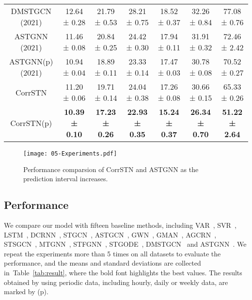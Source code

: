 \documentclass[sn-mathphys,iicol]{sn-jnl}
\newcommand\tabref[1]{Table~\ref{#1}}
\theoremstyle{thmstyleone}\newtheorem{theorem}{Theorem}\newtheorem{proposition}[theorem]{Proposition}
\theoremstyle{thmstyletwo}\newtheorem{example}{Example}\newtheorem{remark}{Remark}
\theoremstyle{thmstylethree}\newtheorem{definition}{Definition}
\begin{document}
\begin{table*}[!h]
{\begin{tabular}{c|ccc|ccc}
DMSTGCN (2021)                  & 12.64 ± 0.28          & 21.79 ± 0.53          & 28.21 ± 0.75          & 18.52 ± 0.37          & 32.26 ± 0.84          & 77.08 ± 0.76          \\
ASTGNN (2021)                   & 11.46 ± 0.08          & 20.84 ± 0.25          & 24.42 ± 0.30          & 17.94 ± 0.11          & 31.91 ± 0.32          & 72.46 ± 2.42          \\
ASTGNN(p) (2021)                & 10.94 ± 0.04          & 18.89 ± 0.11          & 23.33 ± 0.14          & 17.47 ± 0.03          & 30.78 ± 0.08          & 70.52 ± 0.27          \\ \hline
CorrSTN                         & 11.20 ± 0.06          & 19.71 ± 0.14          & 24.04 ± 0.38          & 17.26 ± 0.08          & 30.66 ± 0.15          & 65.33 ± 0.26          \\
CorrSTN(p)                      & \textbf{10.39 ± 0.10} & \textbf{17.23 ± 0.26} & \textbf{22.93 ± 0.35} & \textbf{15.24 ± 0.37} & \textbf{26.34 ± 0.70} & \textbf{51.22 ± 2.64} \\ \hline
\end{tabular}
}
\end{table*}

\begin{figure*}[!h]
 \centering
 \texttt{[image: 05-Experiments.pdf]}
 \caption{Performance comparsion of CorrSTN and ASTGNN as the prediction interval increases.}
 \label{fig:Experiments}
 \end{figure*}

\subsection{Performance}

We compare our model with fifteen baseline methods, including VAR~\cite{Lu:2003br}, SVR~\cite{Drucker:1997}, LSTM~\cite{Hochreiter:1997}, DCRNN~\cite{li2018diffusion}, STGCN~\cite{yu2018spatio}, ASTGCN~\cite{Guo.2019}, GWN~\cite{Wu:2019}, GMAN~\cite{Zheng.2020}, AGCRN~\cite{Bai:2020}, STSGCN~\cite{Song.2020}, MTGNN~\cite{Wu:2020}, STFGNN~\cite{Li_Zhu_2021}, STGODE~\cite{Fang:2021}, DMSTGCN~\cite{Han:2021} and ASTGNN~\cite{Guo.2021}. We repeat the experiments more than 5 times on all datasets to evaluate the performance, and the means and standard deviations are collected in~\tabref{tab:result}, where the bold font highlights the best values. The results obtained by using periodic data, including hourly, daily or weekly data, are marked by (p).
\end{document}
